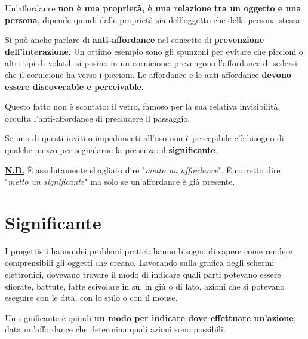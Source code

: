 \documentclass[a4paper,11pt,oneside]{book}
\begin{document}
Un'affordance \textbf{non è una proprietà, è una relazione tra un oggetto e una persona}, dipende quindi dalle proprietà sia dell'oggetto che della persona stessa.

Si può anche parlare di \textbf{anti-affordance} nel concetto di \textbf{prevenzione dell'interazione}. Un ottimo esempio sono gli spunzoni per evitare che piccioni o altri tipi di volatili si posino in un cornicione: prevengono l'affordance di sedersi che il cornicione ha verso i piccioni.
Le affordance e le anti-affordance \textbf{devono essere discoverable e perceivable}.

\pagebreak

Questo fatto non è scontato: il vetro, famoso per la sua relativa invisibilità, occulta l'anti-affordance di precludere il passaggio.

Se uno di questi inviti o impedimenti all'uso non è percepibile c'è bisogno di qualche mezzo per segnalarne la presenza: il \textbf{significante}.

\textbf{\underline{N.B.}} È assolutamente sbagliato dire "\textit{metto un affordance}". È corretto dire "\textit{metto un significante}" ma solo se un'affordance è già presente.

\section{Significante}
I progettisti hanno dei problemi pratici: hanno bisogno di sapere come rendere comprensibili gli oggetti che creano. Lavorando sulla grafica degli schermi elettronici, dovevano trovare il modo di indicare quali parti potevano essere sfiorate, battute, fatte scivolare in sù, in giù o di lato, azioni che si potevano eseguire con le dita, con lo stilo o con il mouse.

Un significante è quindi \textbf{un modo per indicare dove effettuare un'azione}, data un'affordance che determina quali azioni sono possibili.
\end{document}
